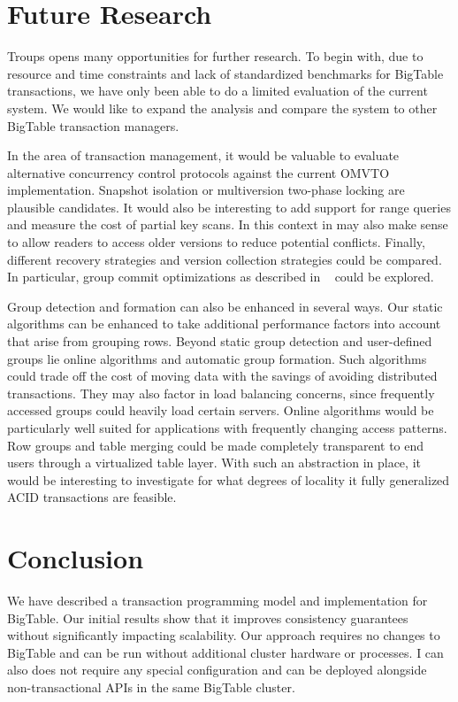 \documentclass[10pt,final,journal]{IEEEtran}
\begin{document}
\section{Future Research}
Troups opens many opportunities for further research. To begin with, due to resource and time constraints and lack of standardized benchmarks for BigTable transactions, we have only been able to do a limited evaluation of the current system. We would like to expand the analysis and compare the system to other BigTable transaction managers.

In the area of transaction management, it would be valuable to evaluate alternative concurrency control protocols against the current OMVTO implementation. Snapshot isolation or multiversion two-phase locking are plausible candidates. It would also be interesting to add support for range queries and measure the cost of partial key scans. In this context in may also make sense to allow readers to access older versions to reduce potential conflicts. Finally, different recovery strategies and version collection strategies could be compared. In particular, group commit optimizations as described in ~\cite{Weikum:2001:TIS} could be explored.

Group detection and formation can also be enhanced in several ways. Our static algorithms can be enhanced to take additional performance factors into account that arise from grouping rows. Beyond static group detection and user-defined groups lie online algorithms and automatic group formation. Such algorithms could trade off the cost of moving data with the savings of avoiding distributed transactions. They may also factor in load balancing concerns, since frequently accessed groups could heavily load certain servers. Online algorithms would be particularly well suited for applications with frequently changing access patterns. Row groups and table merging could be made completely transparent to end users through a virtualized table layer. With such an abstraction in place, it would be interesting to investigate for what degrees of locality it fully generalized ACID transactions are feasible.

\section{Conclusion}
We have described a transaction programming model and implementation for BigTable. Our initial results show that it improves consistency guarantees without significantly impacting scalability. Our approach requires no changes to BigTable and can be run without additional cluster hardware or processes. I can also does not require any special configuration and can be deployed alongside non-transactional APIs in the same BigTable cluster.
\end{document}

